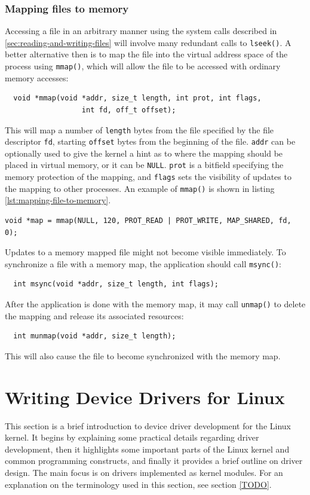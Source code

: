 \subsubsection{Mapping files to memory}\label{mapping-files-to-memory}
Accessing a file in an arbitrary manner using the system calls described in \ref{sec:reading-and-writing-files} will involve many redundant calls to \texttt{lseek()}. A better alternative then is to map the file into the virtual address space of the process using \texttt{mmap()}, which will allow the file to be accessed with ordinary memory accesses:
\begin{verbatim}
  void *mmap(void *addr, size_t length, int prot, int flags,
                  int fd, off_t offset);
\end{verbatim}
This will map a number of \texttt{length} bytes from the file specified by the file descriptor \texttt{fd}, starting 
\texttt{offset} bytes from the beginning of the file. \texttt{addr} can be optionally used to give the kernel a hint as to where the mapping should be placed in virtual memory, or it can be \texttt{NULL}. \texttt{prot} is a bitfield specifying the memory protection of the mapping, and \texttt{flags} sets the visibility of updates to the mapping to other processes. An example of \texttt{mmap()} is shown in listing \ref{lst:mapping-file-to-memory}.
\lstset{style=lststyle-c}
\begin{lstlisting}[caption=Mapping the first 120 bytes of a file to memory,label=lst:mapping-file-to-memory]
void *map = mmap(NULL, 120, PROT_READ | PROT_WRITE, MAP_SHARED, fd, 0);
\end{lstlisting}

Updates to a memory mapped file might not become visible immediately. To synchronize a file with a memory map, the application should call \texttt{msync()}:
\begin{verbatim}
  int msync(void *addr, size_t length, int flags);
\end{verbatim}

After the application is done with the memory map, it may call \texttt{unmap()} to delete the mapping and release its associated resources: 
\begin{verbatim}
  int munmap(void *addr, size_t length);
\end{verbatim}
This will also cause the file to become synchronized with the memory map.



\section{Writing Device Drivers for Linux}
This section is a brief introduction to device driver development for the Linux kernel. It begins by explaining some practical details regarding driver development, then it highlights some important parts of the Linux kernel and common programming constructs, and finally it provides a brief outline on driver design. The main focus is on drivers implemented as kernel modules. For an explanation on the terminology used in this section, see section \ref{TODO}.


